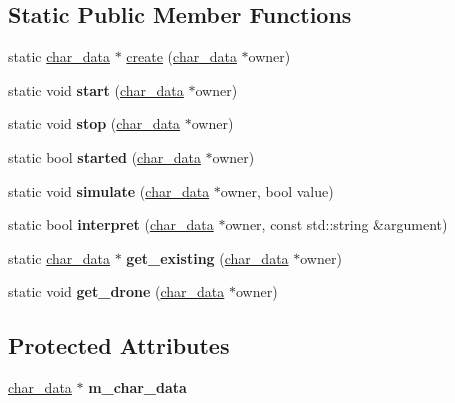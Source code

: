 \subsection*{Static Public Member Functions}
\begin{DoxyCompactItemize}
\item 
static \hyperlink{structchar__data}{char\+\_\+data} $\ast$ \hyperlink{classmods_1_1drone_abad575cd5461c6bc20e089f940c4999e}{create} (\hyperlink{structchar__data}{char\+\_\+data} $\ast$owner)
\item 
\mbox{\label{classmods_1_1drone_a2cea840ae9abfbf60468d36d28fddf5f}} 
static void {\bfseries start} (\hyperlink{structchar__data}{char\+\_\+data} $\ast$owner)
\item 
\mbox{\label{classmods_1_1drone_a0b47f4a0665953bb83daf7229c7cf374}} 
static void {\bfseries stop} (\hyperlink{structchar__data}{char\+\_\+data} $\ast$owner)
\item 
\mbox{\label{classmods_1_1drone_acc4d91b4eef6fbd02baba79fe40274d4}} 
static bool {\bfseries started} (\hyperlink{structchar__data}{char\+\_\+data} $\ast$owner)
\item 
\mbox{\label{classmods_1_1drone_a0a961ebfa7da913e109eb0f55248f0e8}} 
static void {\bfseries simulate} (\hyperlink{structchar__data}{char\+\_\+data} $\ast$owner, bool value)
\item 
\mbox{\label{classmods_1_1drone_a3f65ceced5f358ddcbc1e105cf5a625d}} 
static bool {\bfseries interpret} (\hyperlink{structchar__data}{char\+\_\+data} $\ast$owner, const std\+::string \&argument)
\item 
\mbox{\label{classmods_1_1drone_af1f81721086320faaa931a9f68ee4f7e}} 
static \hyperlink{structchar__data}{char\+\_\+data} $\ast$ {\bfseries get\+\_\+existing} (\hyperlink{structchar__data}{char\+\_\+data} $\ast$owner)
\item 
\mbox{\label{classmods_1_1drone_af40c8d7d60ee9e40f7151e34d6bf2c76}} 
static void {\bfseries get\+\_\+drone} (\hyperlink{structchar__data}{char\+\_\+data} $\ast$owner)
\end{DoxyCompactItemize}
\subsection*{Protected Attributes}
\begin{DoxyCompactItemize}
\item 
\mbox{\label{classmods_1_1drone_aacecd7d93719f3358e5ecbac932865b9}} 
\hyperlink{structchar__data}{char\+\_\+data} $\ast$ {\bfseries m\+\_\+char\+\_\+data}
\end{DoxyCompactItemize}


